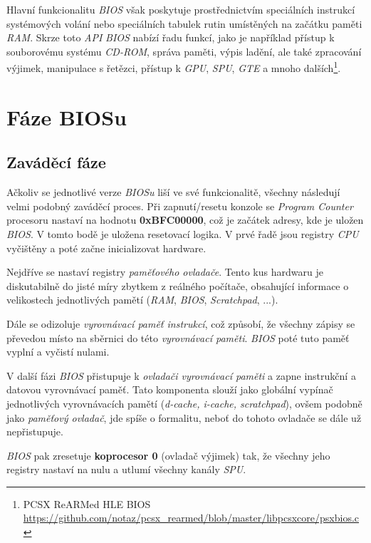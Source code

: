 Hlavní funkcionalitu \textit{BIOS} však poskytuje prostřednictvím speciálních instrukcí systémových volání nebo speciálních tabulek 
rutin umístěných na začátku paměti \textit{RAM}. Skrze toto \textit{API} \textit{BIOS} nabízí řadu funkcí, jako je například 
přístup k souborovému systému \textit{CD-ROM}, správa paměti, výpis ladění, ale také zpracování výjimek, 
manipulace s řetězci, přístup k \textit{GPU}, \textit{SPU}, \textit{GTE} a mnoho dalších\footnote{PCSX ReARMed HLE BIOS \url{https://github.com/notaz/pcsx_rearmed/blob/master/libpcsxcore/psxbios.c}}.

\section{Fáze BIOSu}

\subsection{Zaváděcí fáze}

Ačkoliv se jednotlivé verze \textit{BIOSu} liší ve své funkcionalitě, všechny následují velmi podobný
zaváděcí proces. Při zapnutí/resetu konzole se \textit{Program Counter} procesoru nastaví na hodnotu
\textbf{0xBFC00000}, což je začátek adresy, kde je uložen \textit{BIOS}. V tomto bodě je uložena resetovací
logika. V prvé řadě jsou registry \textit{CPU} vyčištěny a poté začne inicializovat hardware.

Nejdříve se nastaví registry \textit{paměťového ovladače}. Tento kus hardwaru je diskutabilně do jisté míry zbytkem z reálného
počítače, obsahující informace o velikostech jednotlivých pamětí (\textit{RAM}, \textit{BIOS}, \textit{Scratchpad}, ...).

Dále se odizoluje \textit{vyrovnávací paměť instrukcí}, což způsobí, že všechny zápisy se převedou místo na
sběrnici do této \textit{vyrovnávací paměti}. \textit{BIOS} poté tuto paměť vyplní a vyčistí nulami.

V další fázi \textit{BIOS} přistupuje k \textit{ovladači vyrovnávací paměti} a zapne instrukční a datovou vyrovnávací paměť.
Tato komponenta slouží jako globální vypínač jednotlivých vyrovnávacích pamětí (\textit{d-cache, i-cache, scratchpad}), ovšem podobně
jako \textit{paměťový ovladač}, jde spíše o formalitu, neboť do tohoto ovladače se dále už nepřistupuje.

\textit{BIOS} pak zresetuje \textbf{koprocesor 0} (ovladač výjimek) tak, že všechny jeho registry nastaví na nulu a
utlumí všechny kanály \textit{SPU}.

